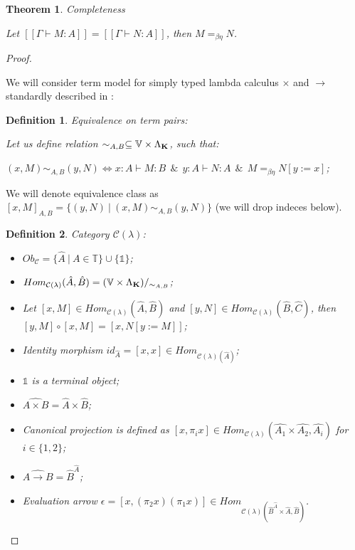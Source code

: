 \documentclass[a4paper]{article}
\newtheorem{theorem}{Theorem}
\newtheorem{defin}{Definition}
\begin{document}
\begin{theorem} Completeness

Let $[\![\Gamma \vdash M : A]\!] = [\![\Gamma \vdash N : A]\!]$, then $M =_{\beta \eta} N$.
\end{theorem}

\begin{proof}

$ $

We will consider term model for simply typed lambda calculus $\times$ and $\to$ standardly described in \cite{LambekScott}:

\begin{defin} Equivalence on term pairs:
  $ $

  Let us define relation $\sim_{A, B} \subseteq \mathbb{V} \times \Lambda_{{\bf K}}$, such that:

  $(x, M) \sim_{A, B} (y, N) \Leftrightarrow x : A \vdash M : B \:\: \& \:\: y : A \vdash N : A \:\: \& \:\: M =_{\beta \eta} N [y := x]$;
\end{defin}

We will denote equivalence class as $[x, M]_{A, B} = \{ (y, N) \: | \: (x, M) \sim_{A, B} (y, N) \}$ (we will drop indeces below).


\begin{defin} Category $\mathcal{C}(\lambda)$:
\begin{itemize}
  \item $Ob_{\mathcal{C}} = \{ \hat{A} \: | \: A \in \mathbb{T} \} \cup \{ \mathds{1} \}$;
  \item $Hom_{\mathcal{C}(\lambda)}(\hat{A},\hat{B}) = (\mathbb{V} \times \Lambda_{{\bf K}})/_{\sim_{A, B}}$;
  \item Let $[x, M] \in Hom_{\mathcal{C}(\lambda)}(\hat{A},\hat{B})$ and $[y,N] \in Hom_{\mathcal{C}(\lambda)}(\hat{B},\hat{C})$, then $[y,M] \circ [x, M] = [x, N [y := M]]$;
  \item Identity morphism $id_{\hat{A}} = [x,x] \in Hom_{\mathcal{C}(\lambda)(\hat{A})}$;
  \item $\mathds{1}$ is a terminal object;
  \item $\widehat{A \times B} = \hat{A} \times \hat{B}$;
  \item Canonical projection is defined as $[x, \pi_i x] \in Hom_{\mathcal{C}(\lambda)}(\hat{A_1} \times \hat{A_2},\hat{A_i})$ for $i \in \{ 1, 2 \}$;
  \item $\widehat{A \to B} = \hat{B}^{\hat{A}}$;
  \item Evaluation arrow $\epsilon = [x, (\pi_2 x) (\pi_1 x)] \in Hom_{\mathcal{C}(\lambda)(\hat{B}^{\hat{A}} \times \hat{A}, \hat{B})}$.
\end{itemize}
\end{defin}


\end{proof}
\end{document}
